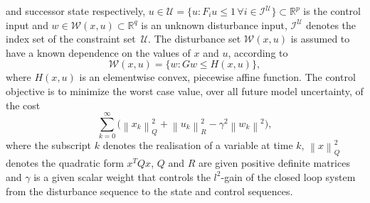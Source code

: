 \documentclass{ifacconf}
\providecommand{\norm}[1]{\left\|#1\right\|}
\begin{document}
and successor state respectively, $u\in\mathcal U=\{u:F_iu\leq 1\,\forall i\in\mathcal I^{\mathcal U}\}
\subset\mathbb R^p$ is the control input
and $w\in\mathcal W(x,u)\subset\mathbb R^q$ is an unknown disturbance input, $\mathcal I^{\mathcal U}$ denotes
the index set of the constraint set~$\mathcal U$. The disturbance set $\mathcal
W(x,u)$ is assumed to have a known dependence on the values of $x$ and $u$, according to
%
\begin{equation}\label{eq:PWA:def:disturbance}
	\mathcal W(x,u) = \{w: Gw \leq H(x,u)\},
\end{equation}
%
where $H(x,u)$ is an elementwise convex, piecewise affine function. The control objective is to minimize the
worst case value, over all future model uncertainty, of the cost
\begin{equation}\label{eq:quadratic:cost}
\sum_{k=0}^\infty \bigl( \norm{x_k}_Q^2 + \norm{u_k}_R^2 - \gamma^2 \norm{w_k}^2 \bigr) ,
\end{equation}
where the subscript $k$ denotes the realisation of a variable at time $k$, $\norm{x}_Q^2$ denotes the quadratic
form $x^TQx$, $Q$ and $R$ are given positive definite
matrices and $\gamma$ is a given scalar weight that controls the $l^2$-gain of the closed loop system from the
disturbance sequence to the state and control sequences.
\end{document}
